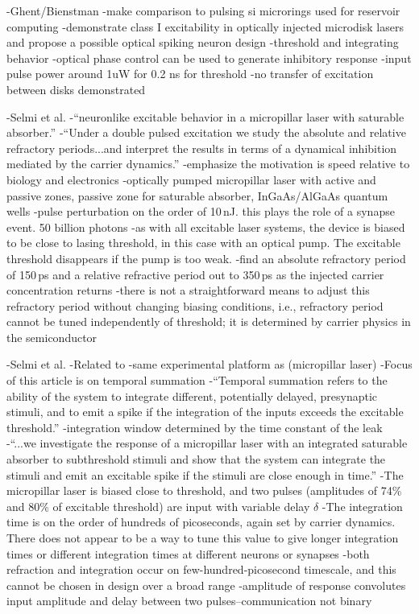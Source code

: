 \cite{alva2013}
-Ghent/Bienstman
-make comparison to pulsing si microrings used for reservoir computing
-demonstrate class I excitability in optically injected microdisk lasers and propose a possible optical spiking neuron design
-threshold and integrating behavior
-optical phase control can be used to generate inhibitory response
-input pulse power around 1uW for 0.2 ns for threshold
-no transfer of excitation between disks demonstrated

\cite{sebr2014}
-Selmi et al.
-``neuronlike excitable behavior in a micropillar laser with saturable absorber.''
-``Under a double pulsed excitation we study the absolute and relative refractory periods...and interpret the results in terms of a dynamical inhibition mediated by the carrier dynamics.''
-emphasize the motivation is speed relative to biology and electronics
-optically pumped micropillar laser with active and passive zones, passive zone for saturable absorber, InGaAs/AlGaAs quantum wells
-pulse perturbation on the order of 10\,nJ. this plays the role of a synapse event. 50 billion photons
-as with all excitable laser systems, the device is biased to be close to lasing threshold, in this case with an optical pump. The excitable threshold disappears if the pump is too weak.
-find an absolute refractory period of 150\,ps and a relative refractive period out to 350\,ps as the injected carrier concentration returns
-there is not a straightforward means to adjust this refractory period without changing biasing conditions, i.e., refractory period cannot be tuned independently of threshold; it is determined by carrier physics in the semiconductor

\cite{sebr2015}
-Selmi et al.
-Related to \cite{sebr2014}
-same experimental platform as \cite{sebr2014} (micropillar laser)
-Focus of this article is on temporal summation
-``Temporal summation refers to the ability of the system to integrate different, potentially delayed, presynaptic stimuli, and to emit a spike if the integration of the inputs exceeds the excitable threshold.''
-integration window determined by the time constant of the leak
-``...we investigate the response of a micropillar laser with an integrated saturable absorber to subthreshold stimuli and show that the system can integrate the stimuli and emit an excitable spike if the stimuli are close enough in time.''
-The micropillar laser is biased close to threshold, and two pulses (amplitudes of 74\% and 80\% of excitable threshold) are input with variable delay $\delta$
-The integration time is on the order of hundreds of picoseconds, again set by carrier dynamics. There does not appear to be a way to tune this value to give longer integration times or different integration times at different neurons or synapses
-both refraction and integration occur on few-hundred-picosecond timescale, and this cannot be chosen in design over a broad range
-amplitude of response convolutes input amplitude and delay between two pulses--communication not binary

